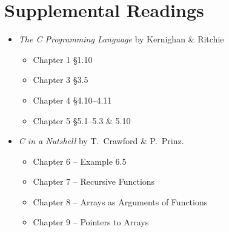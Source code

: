 \section{Supplemental Readings}

\begin{itemize}
    \item \textit{The C Programming Language} by Kernighan \& Ritchie
    \begin{itemize}
	\item Chapter 1 \S 1.10
	\item Chapter 3 \S 3.5
        \item Chapter 4 \S 4.10--4.11
        \item Chapter 5 \S 5.1--5.3 \& 5.10
    \end{itemize}
     \item  \emph{C in a Nutshell} by T.\ Crawford \& P.\ Prinz.
     \begin{itemize}
      \item Chapter 6 -- Example 6.5		%
      \item Chapter 7 -- Recursive Functions
      \item Chapter 8 -- Arrays as Arguments of Functions
      \item Chapter 9 -- Pointers to Arrays
      \end{itemize}
\end{itemize}
